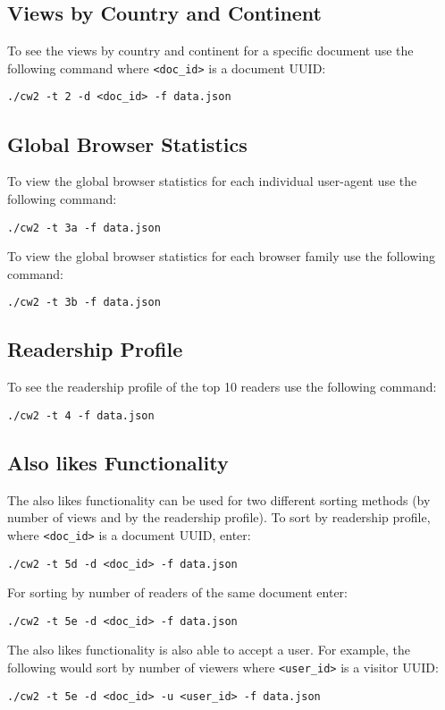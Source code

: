 \documentclass[12pt]{report}
\begin{document}
\subsection{Views by Country and Continent}
To see the views by country and continent for a specific document use the following command where \lstinline{<doc_id>} is a document UUID:
\begin{lstlisting}
./cw2 -t 2 -d <doc_id> -f data.json
\end{lstlisting}
\subsection{Global Browser Statistics}
To view the global browser statistics for each individual user-agent use the following command:
\begin{lstlisting}
./cw2 -t 3a -f data.json
\end{lstlisting}
To view the global browser statistics for each browser family use the following command:
\begin{lstlisting}
./cw2 -t 3b -f data.json
\end{lstlisting}
\subsection{Readership Profile}
To see the readership profile of the top 10 readers use the following command:
\begin{lstlisting}
./cw2 -t 4 -f data.json
\end{lstlisting}
\subsection{Also likes Functionality}
The also likes functionality can be used for two different sorting methods (by number of views and by the readership profile). To sort by readership profile, where \lstinline{<doc_id>} is a document UUID, enter:
\begin{lstlisting}
./cw2 -t 5d -d <doc_id> -f data.json
\end{lstlisting}
For sorting by number of readers of the same document enter:
\begin{lstlisting}
./cw2 -t 5e -d <doc_id> -f data.json
\end{lstlisting}
The also likes functionality is also able to accept a user.  For example, the following would sort by number of viewers where \lstinline{<user_id>} is a visitor UUID:
\begin{lstlisting}
./cw2 -t 5e -d <doc_id> -u <user_id> -f data.json
\end{lstlisting}
\end{document}
